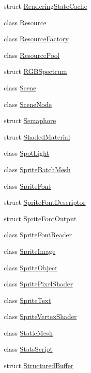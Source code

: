 \begin{DoxyCompactItemize}
\item 
struct \hyperlink{structmage_1_1_rendering_state_cache}{Rendering\+State\+Cache}
\item 
class \hyperlink{classmage_1_1_resource}{Resource}
\item 
class \hyperlink{classmage_1_1_resource_factory}{Resource\+Factory}
\item 
class \hyperlink{classmage_1_1_resource_pool}{Resource\+Pool}
\item 
struct \hyperlink{structmage_1_1_r_g_b_spectrum}{R\+G\+B\+Spectrum}
\item 
class \hyperlink{classmage_1_1_scene}{Scene}
\item 
class \hyperlink{classmage_1_1_scene_node}{Scene\+Node}
\item 
struct \hyperlink{structmage_1_1_semaphore}{Semaphore}
\item 
struct \hyperlink{structmage_1_1_shaded_material}{Shaded\+Material}
\item 
class \hyperlink{classmage_1_1_spot_light}{Spot\+Light}
\item 
class \hyperlink{classmage_1_1_sprite_batch_mesh}{Sprite\+Batch\+Mesh}
\item 
class \hyperlink{classmage_1_1_sprite_font}{Sprite\+Font}
\item 
struct \hyperlink{structmage_1_1_sprite_font_descriptor}{Sprite\+Font\+Descriptor}
\item 
struct \hyperlink{structmage_1_1_sprite_font_output}{Sprite\+Font\+Output}
\item 
class \hyperlink{classmage_1_1_sprite_font_reader}{Sprite\+Font\+Reader}
\item 
class \hyperlink{classmage_1_1_sprite_image}{Sprite\+Image}
\item 
class \hyperlink{classmage_1_1_sprite_object}{Sprite\+Object}
\item 
class \hyperlink{classmage_1_1_sprite_pixel_shader}{Sprite\+Pixel\+Shader}
\item 
class \hyperlink{classmage_1_1_sprite_text}{Sprite\+Text}
\item 
class \hyperlink{classmage_1_1_sprite_vertex_shader}{Sprite\+Vertex\+Shader}
\item 
class \hyperlink{classmage_1_1_static_mesh}{Static\+Mesh}
\item 
class \hyperlink{classmage_1_1_stats_script}{Stats\+Script}
\item 
struct \hyperlink{structmage_1_1_structured_buffer}{Structured\+Buffer}
\item 

\end{DoxyCompactItemize}
